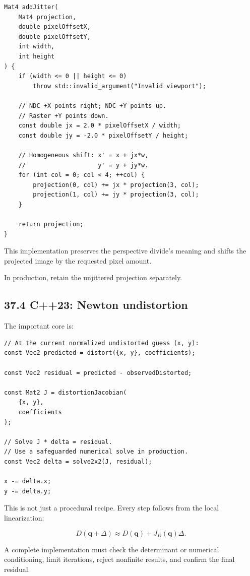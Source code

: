 \begin{verbatim}
Mat4 addJitter(
    Mat4 projection,
    double pixelOffsetX,
    double pixelOffsetY,
    int width,
    int height
) {
    if (width <= 0 || height <= 0)
        throw std::invalid_argument("Invalid viewport");

    // NDC +X points right; NDC +Y points up.
    // Raster +Y points down.
    const double jx = 2.0 * pixelOffsetX / width;
    const double jy = -2.0 * pixelOffsetY / height;

    // Homogeneous shift: x' = x + jx*w,
    //                    y' = y + jy*w.
    for (int col = 0; col < 4; ++col) {
        projection(0, col) += jx * projection(3, col);
        projection(1, col) += jy * projection(3, col);
    }

    return projection;
}
\end{verbatim}

This implementation preserves the perspective divide's meaning and shifts the projected image by the requested pixel amount.

In production, retain the unjittered projection separately.

\subsection{37.4 C++23: Newton undistortion}\label{02-foundations-ii-ch037-c23-newton-undistortion}

The important core is:

\begin{verbatim}
// At the current normalized undistorted guess (x, y):
const Vec2 predicted = distort({x, y}, coefficients);

const Vec2 residual = predicted - observedDistorted;

const Mat2 J = distortionJacobian(
    {x, y},
    coefficients
);

// Solve J * delta = residual.
// Use a safeguarded numerical solve in production.
const Vec2 delta = solve2x2(J, residual);

x -= delta.x;
y -= delta.y;
\end{verbatim}

This is not just a procedural recipe. Every step follows from the local linearization:

\[
 D(\mathbf q+\Delta) \approx D(\mathbf q)+J_D(\mathbf q)\Delta.
\]

A complete implementation must check the determinant or numerical conditioning, limit iterations, reject nonfinite results, and confirm the final residual.

